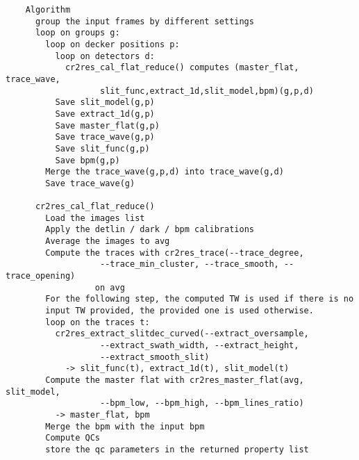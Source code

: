 \begin{verbatim}
    Algorithm                                                             
      group the input frames by different settings                        
      loop on groups g:                                                   
        loop on decker positions p:                                       
          loop on detectors d:                                            
            cr2res_cal_flat_reduce() computes (master_flat, trace_wave,   
                   slit_func,extract_1d,slit_model,bpm)(g,p,d)            
          Save slit_model(g,p)                                            
          Save extract_1d(g,p)                                            
          Save master_flat(g,p)                                           
          Save trace_wave(g,p)                                            
          Save slit_func(g,p)                                             
          Save bpm(g,p)                                                   
        Merge the trace_wave(g,p,d) into trace_wave(g,d)                  
        Save trace_wave(g)                                                
                                                                          
      cr2res_cal_flat_reduce()                                            
        Load the images list                                              
        Apply the detlin / dark / bpm calibrations                        
        Average the images to avg                                         
        Compute the traces with cr2res_trace(--trace_degree,              
                   --trace_min_cluster, --trace_smooth, --trace_opening)  
                  on avg                                                  
        For the following step, the computed TW is used if there is no    
        input TW provided, the provided one is used otherwise.            
        loop on the traces t:                                             
          cr2res_extract_slitdec_curved(--extract_oversample,             
                   --extract_swath_width, --extract_height,               
                   --extract_smooth_slit)                                      
            -> slit_func(t), extract_1d(t), slit_model(t)                 
        Compute the master flat with cr2res_master_flat(avg, slit_model,  
                   --bpm_low, --bpm_high, --bpm_lines_ratio)              
          -> master_flat, bpm                                             
        Merge the bpm with the input bpm                                  
        Compute QCs                                                       
        store the qc parameters in the returned property list             
                                                                          

\end{verbatim}
